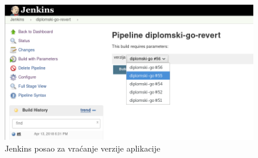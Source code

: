 \begin{figure}[h]
    \centering
    \includegraphics[width=\textwidth]{img/04/jenkins_rollback.png}
    \caption{Jenkins posao za vraćanje verzije aplikacije}%
    \label{fig:04jenkins_rollback}
\end{figure}
